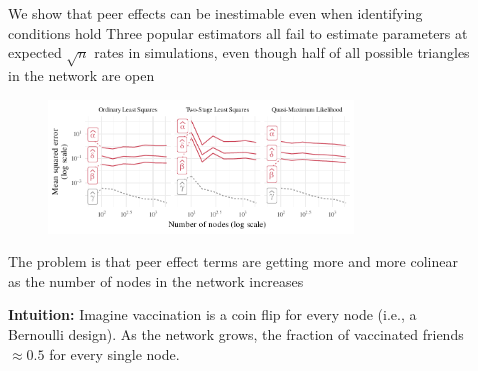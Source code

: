 \documentclass[final]{beamer}
\newlength{\sepwidth}
\newlength{\colwidth}
\newcommand{\separatorcolumn}{\begin{column}{\sepwidth}\end{column}}
\begin{document}
\begin{frame}[t]
\begin{columns}[t]
\begin{column}{\colwidth}
        \end{column}

        \separatorcolumn

        \begin{column}{\colwidth}


            \begin{block}{We show that peer effects can be inestimable even when identifying conditions hold}
                Three popular estimators all fail to estimate parameters at expected $\sqrt{n}$ rates in simulations, even though half of all possible triangles in the network are open
                \begin{figure}
                    \centering
                    \includegraphics[width=0.8\textwidth]{./figures/simulations/biometrika-mse.pdf}
                \end{figure}
            \end{block}

            \begin{block}{The problem is that peer effect terms are getting more and more colinear as the number of nodes in the network increases}

                \textbf{Intuition:} Imagine vaccination is a coin flip for every node (i.e., a Bernoulli design). As the network grows, the fraction of vaccinated friends $\approx 0.5$ for every single node.


\end{block}
\end{column}
\end{columns}
\end{frame}
\end{document}
